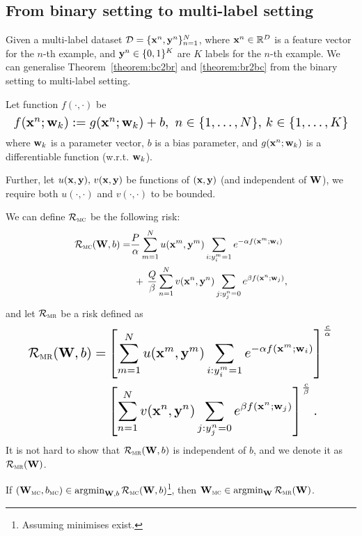 \subsection{From binary setting to multi-label setting}
\label{ssec:ml}

Given a multi-label dataset $\mathcal{D} = \{\mathbf{x}^n, \mathbf{y}^n\}_{n=1}^N$, where $\mathbf{x}^n \in \mathbb{R}^D$ is a feature vector for the $n$-th example,
and $\mathbf{y}^n \in \{0,1\}^K$ are $K$ labels for the $n$-th example.
We can generalise Theorem~\ref{theorem:bc2br} and \ref{theorem:br2bc} from the binary setting to multi-label setting.

Let function $f(\cdot, \cdot)$ be
$$
\resizebox{\linewidth}{!}{$
f(\x^n; \w_k) := g(\x^n; \w_k) + b, \ n \in \{1,\dots,N\}, \, k \in \{1,\dots,K\}
$}
$$
where $\mathbf{w}_k$ is a parameter vector, $b$ is a bias parameter, 
and $g(\mathbf{x}^n; \mathbf{w}_k)$ is a differentiable function (w.r.t. $\mathbf{w}_k$).

Further, let $u(\mathbf{x}, \mathbf{y}), \, v(\mathbf{x}, \mathbf{y})$ be functions of $(\mathbf{x}, \mathbf{y})$ (and independent of $\mathbf{W}$), 
we require both $u(\cdot,\cdot)$ and $v(\cdot,\cdot)$ to be bounded.

We can define $\mathcal{R}_\textsc{mc}$ be the following risk:
\begin{equation*}
\begin{aligned}
\mathcal{R}_\textsc{mc}(\mathbf{W}, b) 
=& \frac{P}{\alpha} \sum_{m=1}^N u(\mathbf{x}^m, \mathbf{y}^m) \sum_{i: y_i^m = 1} e^{-\alpha f(\mathbf{x}^m; \mathbf{w}_i)} \\
 & \ + \,
   \frac{Q}{\beta}  \sum_{n=1}^N v(\mathbf{x}^n, \mathbf{y}^n) \sum_{j: y_j^n = 0} e^{ \beta  f(\mathbf{x}^n; \mathbf{w}_j)},
\end{aligned}
\end{equation*}
and let $\mathcal{R}_\textsc{mr}$ be a risk defined as
\begin{equation}
\label{eq:mr}
\resizebox{0.91\linewidth}{!}{$
\begin{aligned}
\RCal_\textsc{mr}(\W, b) 
=& \left[ \sum_{m=1}^N u(\x^m, \y^m) \sum_{i: y_i^m = 1} e^{-\alpha f(\x^m; \w_i)} \right]^\frac{c}{\alpha}  \\
 & \left[ \sum_{n=1}^N v(\x^n, \y^n) \sum_{j: y_j^n = 0} e^{ \beta  f(\x^n; \w_j)} \right]^\frac{c}{\beta}.
\end{aligned}
$}
\end{equation}
It is not hard to show that $\mathcal{R}_\textsc{mr}(\mathbf{W}, b)$ is independent of $b$, and we denote it as $\mathcal{R}_\textsc{mr}(\mathbf{W})$.


\begin{theorem}
\label{theorem:mc2mr}
If $(\mathbf{W}_\textsc{mc}, b_\textsc{mc}) \in \operatorname*{argmin}_{\mathbf{W},b} \mathcal{R}_\textsc{mc}(\mathbf{W}, b)$\footnote{Assuming minimises exist.\label{ft:minexist2}},
then $\mathbf{W}_\textsc{mc} \in \operatorname*{argmin}_{\mathbf{W}} \mathcal{R}_\textsc{mr}(\mathbf{W})$.
\end{theorem}


